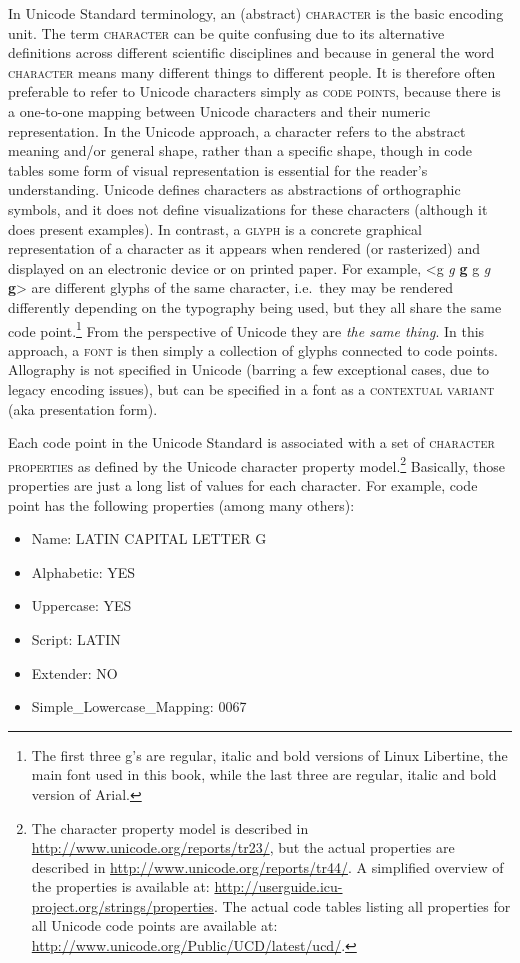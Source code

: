 In Unicode Standard terminology, an (abstract) \textsc{character} is the basic
encoding unit. The term \textsc{character} can be quite confusing due to its
alternative definitions across different scientific disciplines and because in
general the word \textsc{character} means many different things to different
people. It is therefore often preferable to refer to Unicode characters simply
as \textsc{code points}, because there is a one-to-one mapping between Unicode
characters and their numeric representation. In the Unicode approach, a
character refers to the abstract meaning and/or general shape, rather than a
specific shape, though in code tables some form of visual representation is
essential for the reader's understanding. Unicode defines characters as
abstractions of orthographic symbols, and it does not define visualizations for
these characters (although it does present examples). In contrast, a
\textsc{glyph} is a concrete graphical representation of a character as it
appears when rendered (or rasterized) and displayed on an electronic device or
on printed paper. For example, <g {\large \textit{g}} \textbf{g}
{ {\small g} \textit{g} \textbf{g}}> are different glyphs of the
same character, i.e.~they may be rendered differently depending on the
typography being used, but they all share the same code point.\footnote{The first three g's 
are regular, italic and bold versions of Linux Libertine, the main font used in this book, 
while the last three are regular, italic and bold version of Arial.} From the
perspective of Unicode they are \textit{the same thing}. In this approach, a
\textsc{font} is then simply a collection of glyphs connected to code points.
Allography is not specified in Unicode (barring a few exceptional cases, due
to legacy encoding issues), but can be specified in a font as a
\textsc{contextual variant} (aka presentation form).

Each code point in the Unicode Standard is associated with a set of
\textsc{character properties} as defined by the Unicode character property
model.\footnote{The character property model is described in
\url{http://www.unicode.org/reports/tr23/}, but the actual properties are
described in \url{http://www.unicode.org/reports/tr44/}. A simplified overview
of the properties is available at: 
\url{http://userguide.icu-project.org/strings/properties}. The actual code
tables listing all properties for all Unicode code points are available at: 
\url{http://www.unicode.org/Public/UCD/latest/ucd/}.} Basically, those
properties are just a long list of values for each character. For example, code
point  has the following properties (among many others): 
\begin{itemize}
	\item Name: LATIN CAPITAL LETTER G 
	\item Alphabetic: YES 
	\item Uppercase: YES 
	\item Script: LATIN 
	\item Extender: NO 
	\item Simple\_Lowercase\_Mapping: 0067 
\end{itemize}

